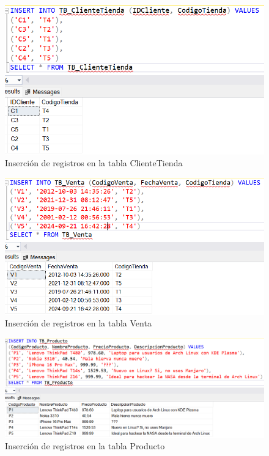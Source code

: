 \begin{figure}[H]
  \centering
  \includegraphics[scale = 0.5]{Imagenes/sql/3.insertar_registros/insertar_registros_clientetienda.png}
  \caption{Inserción de registros en la tabla ClienteTienda}
\end{figure}

\begin{figure}[H]
  \centering
  \includegraphics[scale = 0.5]{Imagenes/sql/3.insertar_registros/insertar_registros_venta.png}
  \caption{Inserción de registros en la tabla Venta}
\end{figure}

\begin{figure}[H]
  \centering
  \includegraphics[scale = 0.5]{Imagenes/sql/3.insertar_registros/insertar_registros_producto.png}
  \caption{Inserción de registros en la tabla Producto}
\end{figure}

